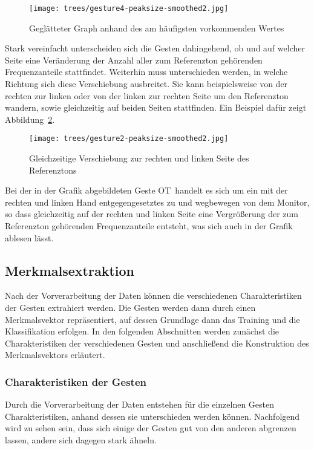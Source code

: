 \begin{figure}[htbp] \centering
\texttt{[image: trees/gesture4-peaksize-smoothed2.jpg]}
\caption{Geglätteter Graph anhand des am häufigsten vorkommenden Wertes}
\label{fig:frequent_value}
\end{figure}


Stark vereinfacht unterscheiden sich die Gesten dahingehend, ob und auf welcher Seite 
eine Veränderung der Anzahl aller zum Referenzton gehörenden Frequenzanteile stattfindet. 
Weiterhin muss unterschieden werden, in welche Richtung sich diese Verschiebung ausbreitet. 
Sie kann beispielsweise von der rechten zur linken oder von der linken zur rechten Seite 
um den Referenzton wandern, sowie gleichzeitig auf beiden Seiten stattfinden. 
Ein Beispiel dafür zeigt Abbildung~\ref{fig:left_right_same_time}.

\begin{figure}[htbp] \centering
\texttt{[image: trees/gesture2-peaksize-smoothed2.jpg]}
\caption{Gleichzeitige Verschiebung zur rechten und linken Seite des Referenztons}
\label{fig:left_right_same_time}
\end{figure}

Bei der in der Grafik abgebildeten Geste \glqq \acl{OT}\grqq\ handelt es sich um ein mit der rechten und linken Hand entgegengesetztes zu und wegbewegen von dem Monitor, so dass gleichzeitig auf der rechten und linken Seite eine Vergrößerung der 
zum Referenzton gehörenden Frequenzanteile entsteht, was sich auch in der Grafik ablesen lässt.


\subsection{Merkmalsextraktion} \label{subsec:featureextraction}
Nach der Vorverarbeitung der Daten können die verschiedenen Charakteristiken der Gesten extrahiert werden. Die Gesten werden dann durch einen Merkmalsvektor repräsentiert, auf dessen Grundlage dann das Training und die Klassifikation erfolgen. In den folgenden Abschnitten werden zunächst die Charakteristiken der verschiedenen Gesten und anschließend die Konstruktion des Merkmalsvektors erläutert.

\subsubsection{Charakteristiken der Gesten} \label{charakteristiken}
Durch die Vorverarbeitung der Daten entstehen für die einzelnen Gesten Charakteristiken, anhand dessen sie unterschieden werden können. Nachfolgend wird zu sehen sein, dass sich einige der Gesten gut von den anderen abgrenzen lassen, andere sich dagegen stark ähneln.

